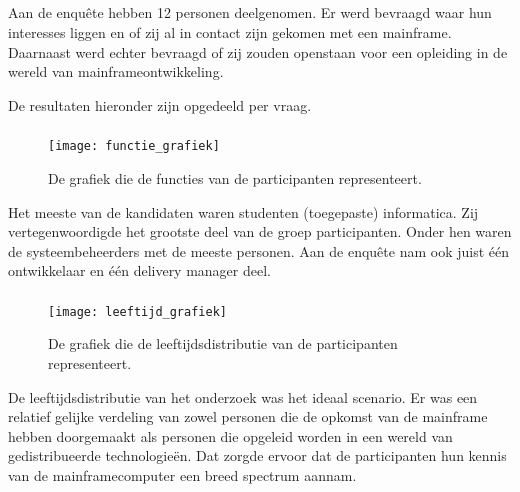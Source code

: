 \newpage

\subsection{}
\label{sec:De resultaten van de bevragingen voor studenten en IT-professionals}

Aan de enquête hebben 12 personen deelgenomen. Er werd bevraagd waar hun interesses liggen en of zij al in contact zijn gekomen met een mainframe. Daarnaast werd echter bevraagd of zij zouden openstaan voor een opleiding in de wereld van mainframeontwikkeling. 

De resultaten hieronder zijn opgedeeld per vraag.

\subsubsection{}
\label{sec:Wat is uw functie?}

 \begin{figure}[h]
    \centering
    \texttt{[image: functie\_grafiek]}
    \caption{De grafiek die  de functies van de participanten representeert.}
\end{figure}

Het meeste van de kandidaten waren studenten (toegepaste) informatica. Zij vertegenwoordigde het grootste deel van de groep participanten. Onder hen waren de systeembeheerders met de meeste personen. Aan de enquête nam ook juist één ontwikkelaar en één delivery manager deel.  

\newpage

\subsubsection{}
\label{sec:Wat is uw leeftijd?}

 \begin{figure}[h]
    \centering
    \texttt{[image: leeftijd\_grafiek]}
    \caption{De grafiek die de leeftijdsdistributie van de participanten representeert.}
\end{figure}


De leeftijdsdistributie van het onderzoek was het ideaal scenario. Er was een relatief gelijke verdeling van zowel personen die de opkomst van de mainframe hebben doorgemaakt als personen die opgeleid worden in een wereld van gedistribueerde technologieën. Dat zorgde ervoor dat de participanten hun kennis van de mainframecomputer een breed spectrum aannam. 

